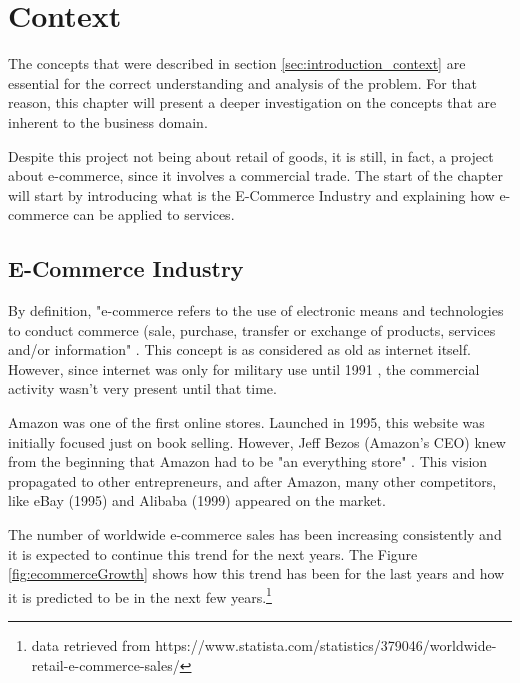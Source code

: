 \chapter{Context} %
\label{chap:Context}

The concepts that were described in section \ref{sec:introduction_context} are essential for the correct understanding and analysis of the problem. For that reason, this chapter will present a deeper investigation on the concepts that are inherent to the business domain.
\par
Despite this project not being about retail of goods, it is still, in fact, a project about e-commerce, since it involves a commercial trade. The start of the chapter will start by introducing what is the E-Commerce Industry and explaining how e-commerce can be applied to services.

\section{E-Commerce Industry}
\label{sec:ecomIndustry}
By definition, "e-commerce refers to the use of electronic means and technologies to conduct commerce (sale, purchase, transfer or exchange of products, services and/or information" \parencite{introductionToECommerce}. This concept is as considered as old as internet itself. However, since internet was only for military use until 1991 \parencite{internetHistory}, the commercial activity wasn't very present until that time. 
\par
Amazon was one of the first online stores. Launched in 1995, this website was initially focused just on book selling. However, Jeff Bezos (Amazon's CEO) knew from the beginning that Amazon had to be "an everything store" \parencite{amazonHistory}. This vision propagated to other entrepreneurs, and after Amazon, many other competitors, like eBay (1995) and Alibaba (1999) appeared on the market. 
\par
The number of worldwide e-commerce sales has been increasing consistently and it is expected to continue this trend for the next years. The Figure  \ref{fig:ecommerceGrowth} shows how this trend has been for the last years and how it is predicted to be in the next few years.\footnote{data retrieved from https://www.statista.com/statistics/379046/worldwide-retail-e-commerce-sales/}

